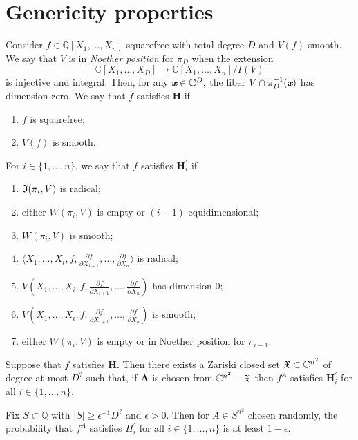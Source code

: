\documentclass[sigconf]{acmart}
\def\xb{\textit{\textbf{x}}}
\def\C{\mathbb{C}}
\def\pa{\partial}
\def\I{\frak{I}}
\begin{document}
\section{Genericity properties}
%
Consider $f \in \mathbb{Q}[X_1,\hdots,X_n]$ squarefree with total degree $D$ and $V(f)$ smooth. We say that $V$ is in \textit{Noether position} for $\pi_D$ when the extension \[\C[X_1,\hdots,X_D] \rightarrow \C[X_1,\hdots,X_n]/I(V)\] is injective and integral.  Then, for any $\xb \in \C^D,$ the fiber 
$V \cap \pi_D^{-1}(\xb)$ has dimension zero. 
We say that $f$ satisfies $\textbf{H}$ if 
\begin{enumerate}
    \item $f$ is squarefree;
    \item $V(f)$ is smooth.
\end{enumerate}
For $i\in\{1,\hdots,n\}$, we say that $f$ satisfies $\textbf{H}_i^{'}$ if 
\begin{enumerate}
\item $\I(\pi_i,V)$ is radical;
\item either $W(\pi_i,V)$ is empty or $(i-1)$-equidimensional;
\item $W(\pi_i,V)$ is smooth;
\item $\langle X_1,\hdots,X_i, f,  \frac{\pa f}{\pa X_{i+1}},\hdots,\frac{\pa f}{\pa X_n}\rangle $ is radical; 
\item $V(X_1,\hdots,X_i, f,  \frac{\pa f}{\pa X_{i+1}},\hdots,\frac{\pa f}{\pa X_n})$ has dimension $0$;
\item $V(X_1,\hdots,X_i, f,  \frac{\pa f}{\pa X_{i+1}},\hdots,\frac{\pa f}{\pa X_n})$ is smooth;
\item either $W(\pi_i,V)$ is empty or in Noether position for $\pi_{i-1}$.
\end{enumerate}
%
\begin{theorem}
Suppose that $f$ satisfies \textbf{H}. Then there exists a Zariski closed set $\frak{X} \subset \mathbb{C}^{n^2}$ of degree at most $D^{\textrm{?}}$ such that, if $\textbf{A}$ is chosen from  $\C^{n^2}-\frak{X}$ then $f^A$ satisfies $\textbf{H}_i^{'}$ for all $i \in \{1,\hdots,n\}.$
\end{theorem}
\begin{corollary} 
Fix $S \subset \mathbb{Q}$ with $|S| \geq \epsilon^{-1} D^{\textrm{?}}$ and $\epsilon > 0$. Then for $A\in S^{n^2}$ chosen randomly, the probability that $f^A$ satisfies $H_i^{'}$ for all $i \in \{1,\hdots,n\}$ is at least $1-\epsilon.$
\end{corollary}
%
%
%
%
%
%
\end{document}
